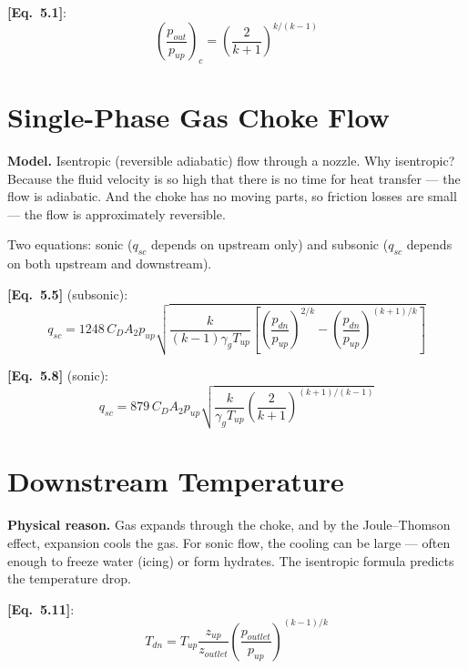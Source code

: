 \documentclass[11pt,a4paper,openany]{book}
\newcommand{\eqrefbook}[1]{\textcolor{blue!60!black}{\textbf{[Eq.~#1]}}}
\begin{document}
\eqrefbook{5.1}:
\begin{equation}
  \left(\frac{p_{out}}{p_{up}}\right)_c
  = \left(\frac{2}{k+1}\right)^{k/(k-1)}
\end{equation}

\section{Single-Phase Gas Choke Flow}

\begin{theory}
\textbf{Model.} Isentropic (reversible adiabatic) flow through a
nozzle. Why isentropic? Because the fluid velocity is so high that
there is no time for heat transfer — the flow is adiabatic. And the
choke has no moving parts, so friction losses are small — the flow is
approximately reversible.

Two equations: sonic ($q_{sc}$ depends on upstream only) and subsonic
($q_{sc}$ depends on both upstream and downstream).
\end{theory}

\eqrefbook{5.5} (subsonic):
\begin{equation}
  q_{sc} = 1248\,C_D A_2 p_{up}\sqrt{\frac{k}{(k-1)\gamma_g T_{up}}
  \left[\left(\frac{p_{dn}}{p_{up}}\right)^{2/k} -
  \left(\frac{p_{dn}}{p_{up}}\right)^{(k+1)/k}\right]}
\end{equation}

\eqrefbook{5.8} (sonic):
\begin{equation}
  q_{sc} = 879\,C_D A_2 p_{up}
  \sqrt{\frac{k}{\gamma_g T_{up}}\left(\frac{2}{k+1}\right)^{(k+1)/(k-1)}}
\end{equation}

\section{Downstream Temperature}

\begin{theory}
\textbf{Physical reason.} Gas expands through the choke, and by the
Joule--Thomson effect, expansion cools the gas. For sonic flow, the
cooling can be large — often enough to freeze water (icing) or form
hydrates. The isentropic formula predicts the temperature drop.
\end{theory}

\eqrefbook{5.11}:
\begin{equation}
  T_{dn} = T_{up}\frac{z_{up}}{z_{outlet}}
  \left(\frac{p_{outlet}}{p_{up}}\right)^{(k-1)/k}
\end{equation}
\end{document}
